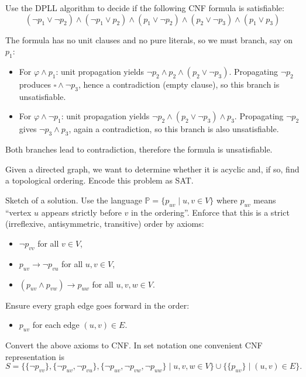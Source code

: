 \begin{problem} \label{problem:dpll}

    Use the DPLL algorithm to decide if the following CNF formula is satisfiable:
    $$ 
    (\neg p_1 \lor \neg p_2)\land( \neg p_1 \lor p_2)\land( p_1 \lor \neg p_2)\land( p_2 \lor \neg p_3)\land( p_1 \lor p_3)
    $$

    \begin{solution}
        The formula has no unit clauses and no pure literals, so we must branch, say on $p_1$:
        \begin{itemize}
            \item For $\varphi\land p_1$: unit propagation yields $\neg p_2\land p_2\land( p_2 \lor \neg p_3)$. Propagating $\neg p_2$ produces $\square\land\neg p_3$, hence a contradiction (empty clause), so this branch is unsatisfiable.
            \item For $\varphi\land \neg p_1$: unit propagation yields $\neg p_2\land( p_2 \lor \neg p_3)\land p_3$. Propagating $\neg p_2$ gives $\neg p_3\land p_3$, again a contradiction, so this branch is also unsatisfiable.            
        \end{itemize}
        Both branches lead to contradiction, therefore the formula is unsatisfiable.                        
    \end{solution}

\end{problem}


\begin{problem}

    Given a directed graph, we want to determine whether it is acyclic and, if so, find a topological ordering. Encode this problem as SAT.

    \begin{solution}
        Sketch of a solution. Use the language $\mathbb P=\{p_{uv}\mid u,v\in V\}$ where $p_{uv}$ means “vertex $u$ appears strictly before $v$ in the ordering”. Enforce that this is a strict (irreflexive, antisymmetric, transitive) order by axioms:
        \begin{itemize}
            \item $\neg p_{vv}$ for all $v\in V$,
            \item $p_{uv}\to\neg p_{vu}$ for all $u,v\in V$,
            \item $(p_{uv}\land p_{vw})\to p_{uw}$ for all $u,v,w\in V$.
        \end{itemize}
        Ensure every graph edge goes forward in the order:
        \begin{itemize}
            \item $p_{uv}$ for each edge $(u,v)\in E$.
        \end{itemize}
        Convert the above axioms to CNF. In set notation one convenient CNF representation is
        $$
        S=\{\{\neg p_{vv}\},\{\neg p_{uv},\neg p_{vu}\},\{\neg p_{uv},\neg p_{vw},\neg p_{uw}\} \mid u,v,w\in V\}\cup\{\{p_{uv}\}\mid(u,v)\in E\}.
        $$
    \end{solution}

\end{problem}
    
